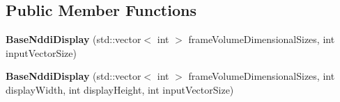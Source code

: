 \subsection*{Public Member Functions}
\begin{DoxyCompactItemize}
\item 
\hypertarget{classnddi_1_1_base_nddi_display_a9818417dc2fe9124a0e8701502a1f50b}{
{\bfseries BaseNddiDisplay} (std::vector$<$ int $>$ frameVolumeDimensionalSizes, int inputVectorSize)}
\label{classnddi_1_1_base_nddi_display_a9818417dc2fe9124a0e8701502a1f50b}

\item 
\hypertarget{classnddi_1_1_base_nddi_display_a111a6f33a9c64ea8a2919164d8aa314a}{
{\bfseries BaseNddiDisplay} (std::vector$<$ int $>$ frameVolumeDimensionalSizes, int displayWidth, int displayHeight, int inputVectorSize)}
\label{classnddi_1_1_base_nddi_display_a111a6f33a9c64ea8a2919164d8aa314a}


\end{DoxyCompactItemize}

